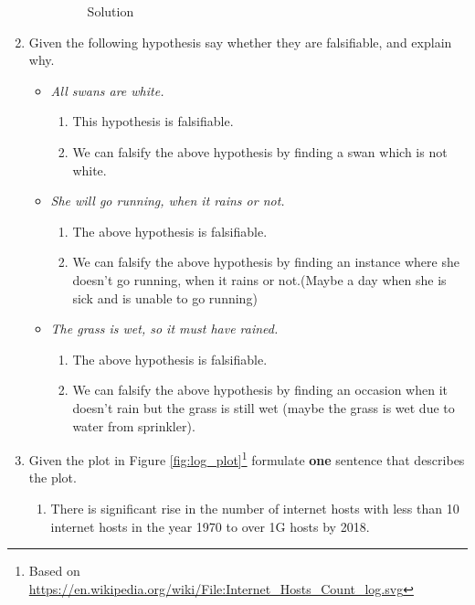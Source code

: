 \documentclass{resources/WeSTassignment}
\begin{document}
\begin{enumerate}
\begin{enumerate}
\begin{figure}[h]
    \caption{Solution}  
    \label{fig:Solution}
\end{figure}
    \end{enumerate}
    
    \item Given the following hypothesis say whether they are falsifiable, and explain why.
        \begin{itemize}
            \item \emph{All swans are white.}
            \begin{enumerate}
            \item This hypothesis is falsifiable.
            \item We can falsify the above hypothesis by finding a swan which is not white.
            \end{enumerate}
            \item \emph{She will go running, when it rains or not.}
            \begin{enumerate}
            \item The above hypothesis is falsifiable.
            \item We can falsify the above hypothesis by finding an instance where she doesn't go running, when it rains or not.(Maybe a day when she is sick and is unable to go running)
            \end{enumerate}
            \item \emph{The grass is wet, so it must have rained.}
            \begin{enumerate}
            \item The above hypothesis is falsifiable.
            \item We can falsify the above hypothesis by finding an occasion when it doesn't rain but the grass is still wet (maybe the grass is wet due to water from sprinkler).
            \end{enumerate}
        \end{itemize}
    \item Given the plot in Figure \ref{fig:log_plot}\footnote{Based on       \url{https://en.wikipedia.org/wiki/File:Internet\_Hosts\_Count\_log.svg} }  formulate \textbf{one} sentence that describes the plot.
    \begin{enumerate}
    	\item There is significant rise in the number of internet hosts with less than 10 internet hosts in the year 1970 to over 1G hosts by 2018.
    \end{enumerate}
\end{enumerate}
\end{document}
